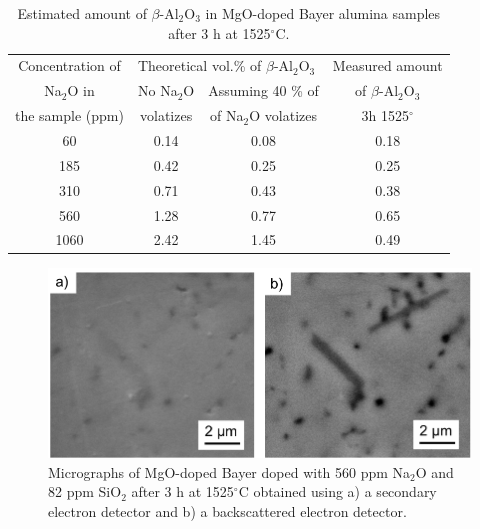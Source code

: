 \newpage
\begin{table}[H]
	\caption{Estimated amount of $\beta$-Al$_{2}$O$_{3}$ in MgO-doped Bayer alumina samples after 3 h at 1525$^{\circ}$C.}
	\centering
	\begin{tabular}{ | c | c | c | c | }
		\hline
		Concentration of  & \multicolumn{2}{l|}{Theoretical vol.\% of $\beta$-Al$_{2}$O$_{3}$} & Measured amount \\
		\cline{2-3}
		Na$_{2}$O in & No Na$_{2}$O & Assuming 40 \% of & of $\beta$-Al$_{2}$O$_{3}$\\
		the sample (ppm) & volatizes & of Na$_{2}$O volatizes & 3h 1525$^{\circ}$\\		
		\hline
		60 & 0.14 & 0.08 & 0.18\\
		\hline
		185 & 0.42 & 0.25 & 0.25\\
		\hline
		310 & 0.71 & 0.43 & 0.38\\
		\hline
		560 & 1.28 & 0.77 & 0.65\\
		\hline
		1060 & 2.42 & 1.45 & 0.49\\
		\hline
	\end{tabular}
	\label{Ch5-table:table2}
\end{table}
\clearpage

\newpage
\begin{figure}[H]
	\centering
	\includegraphics[width=\textwidth]{Chapter-5/Figures/Figure1.png}
	\caption{Micrographs of MgO-doped Bayer doped with 560 ppm Na$_{2}$O and 82 ppm SiO$_{2}$ after 3 h at 1525$^{\circ}$C obtained using a) a secondary electron detector and b) a backscattered electron detector.}
	\label{Ch5-figure:Figure1}
\end{figure}

